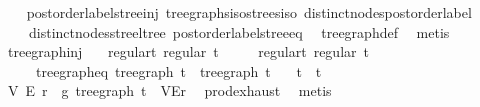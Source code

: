 \begin{isabellebody}
\ \ %
\endisadelimproof
%
\isatagproof
{}\isamarkupfalse%
\ postorder{\isacharunderscore}{\kern0pt}label{\isacharunderscore}{\kern0pt}stree{\isacharunderscore}{\kern0pt}inj\ tree{\isacharunderscore}{\kern0pt}graphs{\isacharunderscore}{\kern0pt}iso{\isacharunderscore}{\kern0pt}strees{\isacharunderscore}{\kern0pt}iso\ distinct{\isacharunderscore}{\kern0pt}nodes{\isacharunderscore}{\kern0pt}postorder{\isacharunderscore}{\kern0pt}label\isanewline
\ \ \ \ distinct{\isacharunderscore}{\kern0pt}nodes{\isacharunderscore}{\kern0pt}stree{\isacharunderscore}{\kern0pt}ltree\ postorder{\isacharunderscore}{\kern0pt}label{\isacharunderscore}{\kern0pt}stree{\isacharunderscore}{\kern0pt}eq\ \isamarkupfalse%
\ tree{\isacharunderscore}{\kern0pt}graph{\isacharunderscore}{\kern0pt}def\ \isamarkupfalse%
\ metis%
\endisatagproof
{\isafoldproof}%
%
\isadelimproof
\isanewline
%
\endisadelimproof
\isanewline
{}\isamarkupfalse%
\ tree{\isacharunderscore}{\kern0pt}graph{\isacharunderscore}{\kern0pt}inj{\isacharcolon}{\kern0pt}\isanewline
\ \ \ regular{\isacharunderscore}{\kern0pt}t{}{\isacharcolon}{\kern0pt}\ {\isachardoublequoteopen}regular\ t{}{\isachardoublequoteclose}\isanewline
\ \ \ \ \ regular{\isacharunderscore}{\kern0pt}t{}{\isacharcolon}{\kern0pt}\ {\isachardoublequoteopen}regular\ t{}{\isachardoublequoteclose}\isanewline
\ \ \ \ \ tree{\isacharunderscore}{\kern0pt}graph{\isacharunderscore}{\kern0pt}eq{\isacharcolon}{\kern0pt}\ {\isachardoublequoteopen}tree{\isacharunderscore}{\kern0pt}graph\ t{}\ {\isacharequal}{\kern0pt}\ tree{\isacharunderscore}{\kern0pt}graph\ t{}{\isachardoublequoteclose}\isanewline
\ \ \ {\isachardoublequoteopen}t{}\ {\isacharequal}{\kern0pt}\ t{}{\isachardoublequoteclose}\isanewline
%
\isadelimproof
%
\endisadelimproof
%
\isatagproof
{}\isamarkupfalse%
{\isacharminus}{\kern0pt}\isanewline
\ \ \isamarkupfalse%
\ V\ E\ r\ \ g{\isacharcolon}{\kern0pt}\ {\isachardoublequoteopen}tree{\isacharunderscore}{\kern0pt}graph\ t{}\ {\isacharequal}{\kern0pt}\ {\isacharparenleft}{\kern0pt}V{\isacharcomma}{\kern0pt}E{\isacharcomma}{\kern0pt}r{\isacharparenright}{\kern0pt}{\isachardoublequoteclose}\ \isamarkupfalse%
\ prod{\isachardot}{\kern0pt}exhaust\ \isamarkupfalse%
\ metis\isanewline
\ \ \isamarkupfalse%
\ \isamarkupfalse%

\end{isabellebody}
